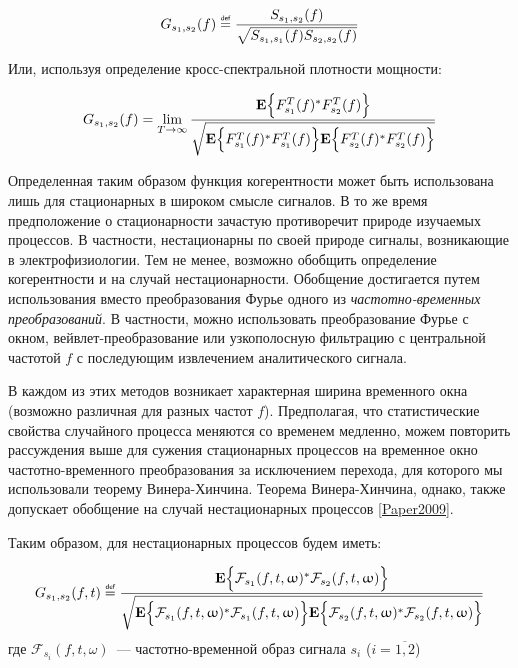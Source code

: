 \begin{equation}
    G_{s_1,s_2}(f) \defeq \frac{S_{s_1,s_2}(f)}{\sqrt{S_{s_1,s_1}(f)S_{s_2,s_2}(f)}}
    \label{def_coh}
\end{equation}

Или, используя определение кросс-спектральной плотности мощности:

\begin{equation}
    G_{s_1,s_2}(f) = \lim_{T \to \infty}
    \frac{\mathbf{E}\Big\{F_{s_1}^T(f)^*F_{s_2}^T(f)\Big\}}
    {\sqrt{\mathbf{E}\Big\{F_{s_1}^T(f)^*F_{s_1}^T(f)\Big\}
    \mathbf{E}\Big\{F_{s_2}^T(f)^*F_{s_2}^T(f)\Big\}}}
\end{equation}

Определенная таким образом функция когерентности может быть использована
лишь для стационарных в широком смысле сигналов.
В то же время предположение о стационарности зачастую противоречит природе изучаемых
процессов. В частности, нестационарны по своей природе сигналы, возникающие в
электрофизиологии.
Тем не менее, возможно обобщить определение когерентности и на случай нестационарности.
Обобщение достигается путем использования вместо преобразования Фурье одного из
\emph{частотно-временных преобразований}.
В частности, можно использовать преобразование Фурье с окном, вейвлет-преобразование или узкополосную
фильтрацию с центральной частотой $f$ с последующим извлечением аналитического сигнала.

В каждом из этих методов возникает характерная ширина
временного окна (возможно различная для разных частот $f$).
Предполагая, что статистические свойства случайного процесса меняются со временем медленно,
можем повторить рассуждения выше для сужения стационарных процессов
на временное окно частотно-временного преобразования за исключением перехода,
для которого мы использовали теорему Винера-Хинчина.
Теорема Винера-Хинчина, однако, также допускает обобщение на случай нестационарных процессов \ref{Paper2009}.

Таким образом, для нестационарных процессов будем иметь:

\begin{equation}
    G_{s_1,s_2}(f,t) \defeq
    \frac{\Expect{\conj{\mathcal{F}_{s_1}(f,t,\omega)}\mathcal{F}_{s_2}(f,t,\omega)}}
    {\sqrt{\Expect{\conj{\mathcal{F}_{s_1}(f,t,\omega)}\mathcal{F}_{s_1}(f,t,\omega)}
    \Expect{\conj{\mathcal{F}_{s_2}(f,t,\omega)}\mathcal{F}_{s_2}(f,t,\omega)}}}
    \label{nonwss_coh_def}
\end{equation}
где $\mathcal{F}_{s_i}(f,t,\omega)$~--- частотно-временной образ сигнала $s_i$ ($i=\overline{1,2}$)

